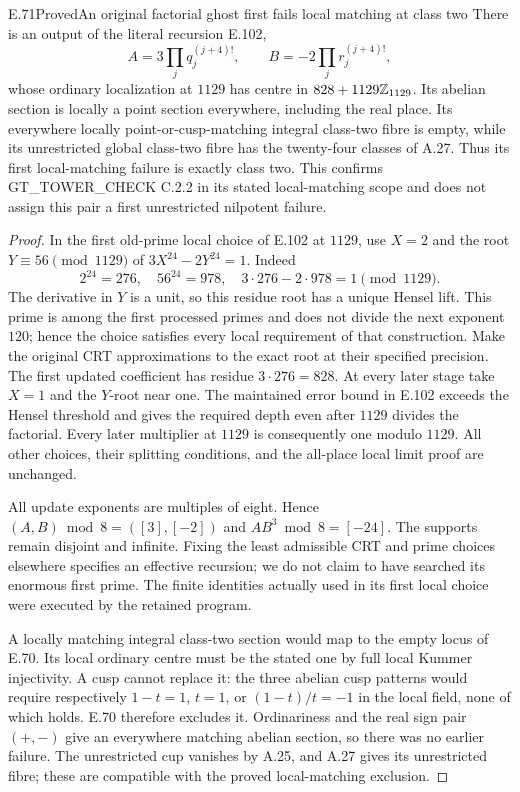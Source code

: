 \begin{result}{E.71}{Proved}{An original factorial ghost first fails local matching at class two}
There is an output of the literal recursion E.102,
\[
 A=3\prod_j q_j^{(j+4)!},\qquad
 B=-2\prod_j r_j^{(j+4)!},
 \tag{E.71.1}
\]
whose ordinary localization at $1129$ has centre in
$828+1129\mathbb Z_{1129}$. Its abelian section is locally a point
section everywhere, including the real place. Its everywhere
locally point-or-cusp-matching integral class-two fibre is empty,
while its unrestricted global class-two fibre has the twenty-four
classes of A.27. Thus its first local-matching failure is exactly
class two. This confirms GT\_TOWER\_CHECK C.2.2 in its stated
local-matching scope and does not assign this pair a first
unrestricted nilpotent failure.
\end{result}
\begin{proof}
In the first old-prime local choice of E.102 at $1129$, use
$X=2$ and the root $Y\equiv56\pmod{1129}$ of
$3X^{24}-2Y^{24}=1$. Indeed
\[
 2^{24}=276,\quad56^{24}=978,\quad
 3\cdot276-2\cdot978=1\pmod{1129}.
 \tag{E.71.2}
\]
The derivative in $Y$ is a unit, so this residue root has a unique
Hensel lift. This prime is among the first processed primes and
does not divide the next exponent $120$; hence the choice satisfies
every local requirement of that construction. Make the original
CRT approximations to the exact root at their specified precision.
The first updated coefficient has residue $3\cdot276=828$.
At every later stage take $X=1$ and the $Y$-root near one.
The maintained error bound in E.102 exceeds the Hensel threshold
and gives the required depth even after $1129$ divides the
factorial. Every later multiplier at $1129$ is consequently one
modulo $1129$. All other choices, their splitting conditions,
and the all-place local limit proof are unchanged.

All update exponents are multiples of eight. Hence
$(A,B)\bmod8=([3],[-2])$ and $AB^3\bmod8=[-24]$.
The supports remain disjoint and infinite. Fixing the least
admissible CRT and prime choices elsewhere specifies an effective
recursion; we do not claim to have searched its enormous first
prime. The finite identities actually used in its first local
choice were executed by the retained program.

A locally matching integral class-two section would map to the
empty locus of E.70. Its local ordinary centre must be the stated
one by full local Kummer injectivity. A cusp cannot replace it:
the three abelian cusp patterns would require respectively
$1-t=1$, $t=1$, or $(1-t)/t=-1$ in the local field, none of
which holds. E.70 therefore excludes it. Ordinariness and the
real sign pair $(+,-)$ give an everywhere matching abelian section,
so there was no earlier failure. The unrestricted cup vanishes by
A.25, and A.27 gives its unrestricted fibre; these are compatible
with the proved local-matching exclusion.
\end{proof}

